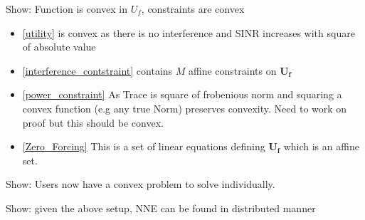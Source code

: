 \documentclass[12pt]{article}
\begin{document}
Show: Function is convex in $U_f$, constraints are convex
\\
\begin{itemize}
\item\eqref{utility} is convex as there is no interference and SINR increases with square of absolute value

\item\eqref{interference_contstraint} contains $M$ affine constraints on $\mathbf{U_f}$

\item\eqref{power_constraint} As Trace is square of frobenious norm and squaring a convex function (e.g any true Norm) preserves convexity.
Need to work on proof but this should be convex.

\item\eqref{Zero_Forcing} This is a set of linear equations defining $\mathbf{U_f}$ which is an affine set.

\end{itemize}

Show: Users now have a convex problem to solve individually.

Show: given the above setup, NNE can be found in distributed manner
\end{document}
